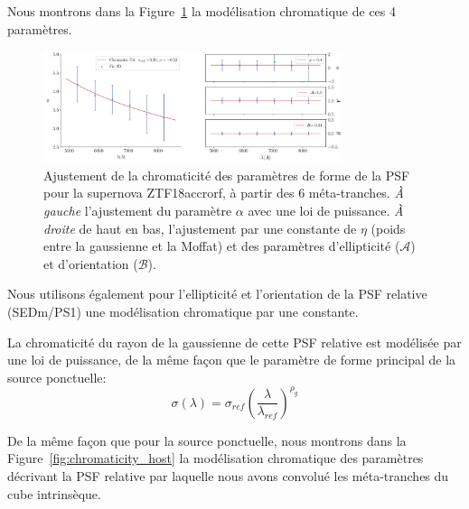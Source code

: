 \documentclass[../main/main.tex]{subfiles}
\begin{document}
Nous montrons dans la Figure~\ref{fig:chromaticity_target} la
modélisation chromatique de ces 4 paramètres. 

\begin{figure}[ht]
  \centering
  \includegraphics[width=0.78\textwidth]{../figures/07_scene/chromaticity_targetZTF18accrorf.pdf}
  \caption[Chromaticité des paramètres de forme de la PSF de la supernova ZTF18accrorf]{Ajustement de
    la chromaticité
    des paramètres de forme de la PSF pour la supernova ZTF18accrorf, à
    partir des 6 méta-tranches. \emph{À gauche} l'ajustement du paramètre $\alpha$ avec une
    loi de puissance. \emph{À droite} de haut en bas, l'ajustement par une
    constante de $\eta$ (poids entre la gaussienne et la Moffat) et des
    paramètres d'ellipticité ($\mathcal{A}$) et d'orientation ($\mathcal{B}$). }
  \label{fig:chromaticity_target}
\end{figure}

Nous utilisons également pour l'ellipticité et l'orientation de la PSF
relative (SEDm/PS1) une modélisation chromatique par une constante.

La chromaticité du rayon de la gaussienne de cette PSF relative est
modélisée par une loi de puissance, de la même façon que le paramètre de forme principal de la
source ponctuelle:
\begin{equation}
  \label{eq:sigmahostchrom}
  \sigma(\lambda)=\sigma_{ref}\left(\frac{\lambda}{\lambda_{ref}}\right)^{\rho_{g}}
\end{equation}

De la même façon que pour la source ponctuelle, nous montrons dans la Figure~\ref{fig:chromaticity_host} la
modélisation chromatique des paramètres décrivant la PSF relative par
laquelle nous avons convolué les méta-tranches du cube intrinsèque.
\end{document}
